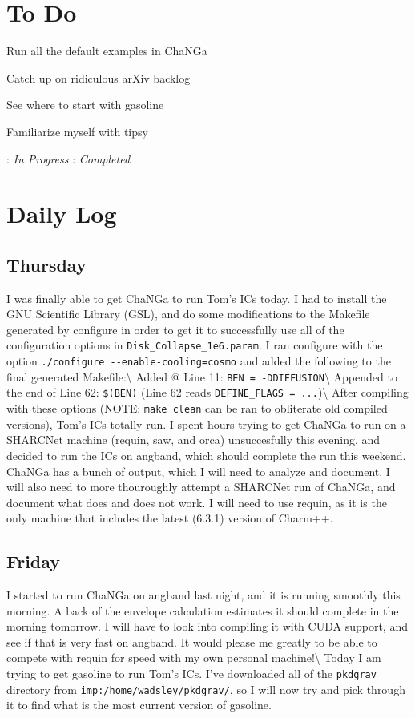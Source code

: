 \documentclass[11pt,letterpaper]{article}
\begin{document}
\section{To Do}
\begin{bullets}
\item[\checkmark] Run all the default examples in ChaNGa
\item[\checkmark] Catch up on ridiculous arXiv backlog
\item[\textleaf] See where to start with gasoline
\item Familiarize myself with tipsy
\end{bullets}

\textleaf : \textit{In Progress} \qquad \checkmark : \textit{Completed}
\section{Daily Log}

\subsection{Thursday}

I was finally able to get ChaNGa to run Tom's ICs today. I had to
install the GNU Scientific Library (GSL), and do some modifications to
the Makefile generated by configure in order to get it to successfully
use all of the configuration options in \verb!Disk_Collapse_1e6.param!.
I ran configure with the option
\verb!./configure --enable-cooling=cosmo! and added the following to the
final generated Makefile:\textbackslash{} Added @ Line 11:
\verb!BEN = -DDIFFUSION!\textbackslash{} Appended to the end of Line 62:
\verb!$(BEN)! (Line 62 reads \verb!DEFINE_FLAGS = ...!)\textbackslash{}
After compiling with these options (NOTE: \verb!make clean! can be ran
to obliterate old compiled versions), Tom's ICs totally run. I spent
hours trying to get ChaNGa to run on a SHARCNet machine (requin, saw,
and orca) unsuccesfully this evening, and decided to run the ICs on
angband, which should complete the run this weekend. ChaNGa has a bunch
of output, which I will need to analyze and document. I will also need
to more thouroughly attempt a SHARCNet run of ChaNGa, and document what
does and does not work. I will need to use requin, as it is the only
machine that includes the latest (6.3.1) version of Charm++.

\subsection{Friday}

I started to run ChaNGa on angband last night, and it is running
smoothly this morning. A back of the envelope calculation estimates it
should complete in the morning tomorrow. I will have to look into
compiling it with CUDA support, and see if that is very fast on angband.
It would please me greatly to be able to compete with requin for speed
with my own personal machine!\textbackslash{} Today I am trying to get
gasoline to run Tom's ICs. I've downloaded all of the \verb!pkdgrav!
directory from \verb!imp:/home/wadsley/pkdgrav/!, so I will now try and
pick through it to find what is the most current version of gasoline.
\end{document}
